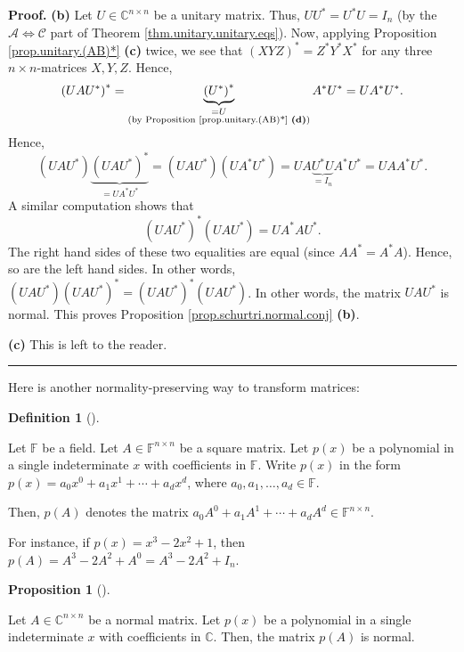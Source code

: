 \documentclass[numbers=enddot,12pt,final,onecolumn,notitlepage]{scrartcl}%
\numberwithin{exer}{subsection}
\theoremstyle{definition}
\newtheorem{prop}[theo]{Proposition}
\newenvironment{proposition}[1][]
{\begin{prop}[#1]\begin{leftbar}}
{\end{leftbar}\end{prop}}
\newtheorem{defi}[theo]{Definition}
\newenvironment{definition}[1][]
{\begin{defi}[#1]\begin{leftbar}}
{\end{leftbar}\end{defi}}
\newenvironment{proof}[1][Proof]{\noindent\textbf{#1.} }{\ \rule{0.5em}{0.5em}}
\begin{document}
\begin{proof}
\textbf{(b)} Let $U\in\mathbb{C}^{n\times n}$ be a unitary matrix. Thus,
$UU^{\ast}=U^{\ast}U=I_{n}$ (by the $\mathcal{A}\Longleftrightarrow
\mathcal{C}$ part of Theorem \ref{thm.unitary.unitary.eqs}). Now, applying
Proposition \ref{prop.unitary.(AB)*} \textbf{(c)} twice, we see that $\left(
XYZ\right)  ^{\ast}=Z^{\ast}Y^{\ast}X^{\ast}$ for any three $n\times
n$-matrices $X,Y,Z$. Hence,%
\[
\left(  UAU^{\ast}\right)  ^{\ast}=\underbrace{\left(  U^{\ast}\right)
^{\ast}}_{\substack{=U\\\text{(by Proposition \ref{prop.unitary.(AB)*}
\textbf{(d)})}}}A^{\ast}U^{\ast}=UA^{\ast}U^{\ast}.
\]
Hence,%
\[
\left(  UAU^{\ast}\right)  \underbrace{\left(  UAU^{\ast}\right)  ^{\ast}%
}_{=UA^{\ast}U^{\ast}}=\left(  UAU^{\ast}\right)  \left(  UA^{\ast}U^{\ast
}\right)  =UA\underbrace{U^{\ast}U}_{=I_{n}}A^{\ast}U^{\ast}=UAA^{\ast}%
U^{\ast}.
\]
A similar computation shows that%
\[
\left(  UAU^{\ast}\right)  ^{\ast}\left(  UAU^{\ast}\right)  =UA^{\ast
}AU^{\ast}.
\]
The right hand sides of these two equalities are equal (since $AA^{\ast
}=A^{\ast}A$). Hence, so are the left hand sides. In other words, $\left(
UAU^{\ast}\right)  \left(  UAU^{\ast}\right)  ^{\ast}=\left(  UAU^{\ast
}\right)  ^{\ast}\left(  UAU^{\ast}\right)  $. In other words, the matrix
$UAU^{\ast}$ is normal. This proves Proposition
\ref{prop.schurtri.normal.conj} \textbf{(b)}. \medskip

\textbf{(c)} This is left to the reader.
\end{proof}

Here is another normality-preserving way to transform matrices:

\begin{definition}
\label{def.schurtri.normal.p(A)}Let $\mathbb{F}$ be a field. Let
$A\in\mathbb{F}^{n\times n}$ be a square matrix. Let $p\left(  x\right)  $ be
a polynomial in a single indeterminate $x$ with coefficients in $\mathbb{F}$.
Write $p\left(  x\right)  $ in the form $p\left(  x\right)  =a_{0}x^{0}%
+a_{1}x^{1}+\cdots+a_{d}x^{d}$, where $a_{0},a_{1},\ldots,a_{d}\in\mathbb{F}$.

Then, $p\left(  A\right)  $ denotes the matrix $a_{0}A^{0}+a_{1}A^{1}%
+\cdots+a_{d}A^{d}\in\mathbb{F}^{n\times n}$.
\end{definition}

For instance, if $p\left(  x\right)  =x^{3}-2x^{2}+1$, then $p\left(
A\right)  =A^{3}-2A^{2}+A^{0}=A^{3}-2A^{2}+I_{n}$.

\begin{proposition}
\label{prop.schurtri.normal.p(A)nor}Let $A\in\mathbb{C}^{n\times n}$ be a
normal matrix. Let $p\left(  x\right)  $ be a polynomial in a single
indeterminate $x$ with coefficients in $\mathbb{C}$. Then, the matrix
$p\left(  A\right)  $ is normal.
\end{proposition}
\end{document}
